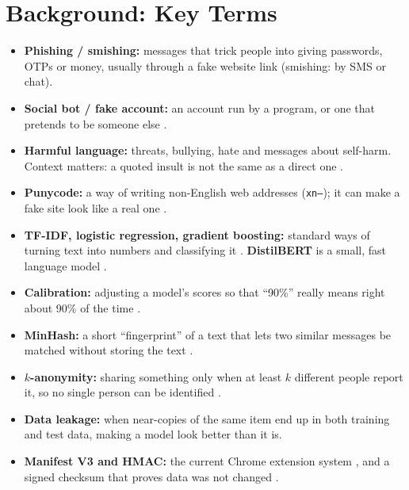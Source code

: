 \section{Background: Key Terms}
\begin{itemize}
\item \textbf{Phishing / smishing:} messages that trick people into giving passwords, OTPs or money, usually through a fake website link (smishing: by SMS or chat).
\item \textbf{Social bot / fake account:} an account run by a program, or one that pretends to be someone else \cite{lit3}.
\item \textbf{Harmful language:} threats, bullying, hate and messages about self-harm. Context matters: a quoted insult is not the same as a direct one \cite{cad}.
\item \textbf{Punycode:} a way of writing non-English web addresses (\texttt{xn--}); it can make a fake site look like a real one \cite{homograph}.
\item \textbf{TF-IDF, logistic regression, gradient boosting:} standard ways of turning text into numbers and classifying it \cite{sklearn}. \textbf{DistilBERT} is a small, fast language model \cite{distilbert}.
\item \textbf{Calibration:} adjusting a model's scores so that ``90\%'' really means right about 90\% of the time \cite{guo}.
\item \textbf{MinHash:} a short ``fingerprint'' of a text that lets two similar messages be matched without storing the text \cite{broder}.
\item \textbf{$k$-anonymity:} sharing something only when at least $k$ different people report it, so no single person can be identified \cite{sweeney}.
\item \textbf{Data leakage:} when near-copies of the same item end up in both training and test data, making a model look better than it is.
\item \textbf{Manifest V3 and HMAC:} the current Chrome extension system \cite{mv3}, and a signed checksum that proves data was not changed \cite{hmac}.
\end{itemize}

